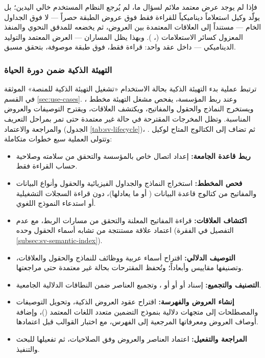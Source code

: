 فإذا لم يوجد عرض معتمد ملائم لسؤال ما، لم يُرجع النظام المستخدم خالي اليدين؛ بل يولّد وكيل  استعلاماً ديناميكياً للقراءة فقط فوق عروض الطبقة حصراً — لا فوق الجداول الخام — مستنداً إلى العلاقات المعتمدة بين العروض، ثم يخضعه للمدقق النحوي والمنفذ المعزول كسائر الاستعلامات (، ). وبهذا يظل المساران — العرض المعتمد والتوليد الديناميكي — داخل عقد واحد: قراءة فقط، فوق طبقة موصوفة، بتحقق مسبق.

\subsubsection{التهيئة الذكية ضمن دورة الحياة}
\label{subsubsec:smart-onboarding}

ترتبط عملية بدء التهيئة الذكية بحالة الاستخدام  «تشغيل التهيئة الذكية للمنصة» الموثقة في القسم \ref{sec:use-cases}. وعند ربط المؤسسة، يفحص مشغل التهيئة مخطط ، ويستخرج النماذج والحقول والمفاتيح، ويكتشف العلاقات، ويقترح التوصيفات والعروض المناسبة. وتظل المخرجات المقترحة في حالة غير معتمدة حتى تمر بمراحل التعريف والمراجعة والاعتماد (الجدول \ref{tab:sv-lifecycle})، ثم تضاف إلى الكتالوج المتاح لوكيل . وتتولى العملية سبع خطوات متكاملة:

\begin{itemize}[label=\textcolor{kauprimary}{$\blacktriangleright$},leftmargin=*]
  \item \textbf{ربط قاعدة الجامعة:} إعداد اتصال خاص بالمؤسسة والتحقق من سلامته وصلاحية حساب القراءة فقط.
  \item \textbf{فحص المخطط:} استخراج النماذج والجداول الفيزيائية والحقول وأنواع البيانات والمفاتيح من كتالوج قاعدة البيانات ( أو ما يعادلها)، دون قراءة السجلات التشغيلية أو استدعاء النموذج اللغوي.
  \item \textbf{اكتشاف العلاقات:} قراءة المفاتيح المعلنة والتحقق من مسارات الربط، مع عدم اعتماد علاقة مستنتجة من تشابه أسماء الحقول وحده (التفصيل في الفقرة \ref{subsec:sv-semantic-index}).
  \item \textbf{التوصيف الدلالي:} اقتراح أسماء عربية ووظائف للنماذج والحقول والعلاقات، وتصنيفها مقاييس وأبعاداً؛ وتُحفظ المقترحات بحالة غير معتمدة حتى مراجعتها.
  \item \textbf{التصنيف والتجميع:} إسناد  أو  أو  أو ، وتجميع العناصر ضمن النطاقات الدلالية الجامعية.
  \item \textbf{إنشاء العروض والفهرسة:} اقتراح عقود العروض الذكية، وتحويل التوصيفات والمصطلحات إلى متجهات دلالية بنموذج التضمين متعدد اللغات المعتمد ()، وإضافة أوصاف العروض ومعرفاتها المرجعية إلى الفهرس، مع اختبار القوالب قبل اعتمادها.
  \item \textbf{المراجعة والتفعيل:} اعتماد العناصر والعروض وفق الصلاحيات، ثم تفعيلها للبحث والتنفيذ.
\end{itemize}

